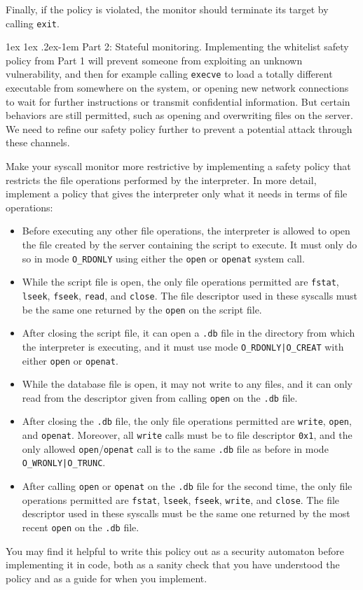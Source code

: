 \documentclass[11pt]{article}
\makeatletter
\renewcommand{\paragraph}{%
  \@startsection{paragraph}{4}%
  {\z@}{1ex \@plus 1ex \@minus .2ex}{-1em}%
  {\normalfont\normalsize\bfseries}
}
\makeatother
\begin{document}
Finally, if the policy is violated, the monitor should terminate its target by calling \verb'exit'.

\paragraph{Part 2: Stateful monitoring.} Implementing the whitelist safety policy from Part 1 will prevent someone from exploiting an unknown vulnerability, and then for example calling \verb'execve' to load a totally different executable from somewhere on the system, or opening new network connections to wait for further instructions or transmit confidential information. But certain behaviors are still permitted, such as opening and overwriting files on the server. We need to refine our safety policy further to prevent a potential attack through these channels.

Make your syscall monitor more restrictive by implementing a safety policy that restricts the file operations performed by the interpreter. In more detail, implement a policy that gives the interpreter only what it needs in terms of file operations:
\begin{itemize}
\item Before executing any other file operations, the interpreter is allowed to open the file created by the server containing the script to execute. It must only do so in mode \verb'O_RDONLY' using either the \verb'open' or \verb'openat' system call.
\item While the script file is open, the only file operations permitted are \verb'fstat', \verb'lseek', \verb'fseek', \verb'read', and \verb'close'. The file descriptor used in these syscalls must be the same one returned by the \verb'open' on the script file.
\item After closing the script file, it can open a \verb'.db' file in the directory from which the interpreter is executing, and it must use mode \verb'O_RDONLY|O_CREAT' with either \verb'open' or \verb'openat'.
\item While the database file is open, it may not write to any files, and it can only read from the descriptor given from calling \verb'open' on the \verb'.db' file.
\item After closing the \verb'.db' file, the only file operations permitted are \verb'write', \verb'open', and \verb'openat'. Moreover, all \verb'write' calls must be to file descriptor \verb'0x1', and the only allowed \verb'open'/\verb'openat' call is to the same \verb'.db' file as before in mode \verb'O_WRONLY|O_TRUNC'.
\item After calling \verb'open' or \verb'openat' on the \verb'.db' file for the second time, the only file operations permitted are \verb'fstat', \verb'lseek', \verb'fseek', \verb'write', and \verb'close'. The file descriptor used in these syscalls must be the same one returned by the most recent \verb'open' on the \verb'.db' file.
\end{itemize}
You may find it helpful to write this policy out as a security automaton before implementing it in code, both as a sanity check that you have understood the policy and as a guide for when you implement.
\end{document}
